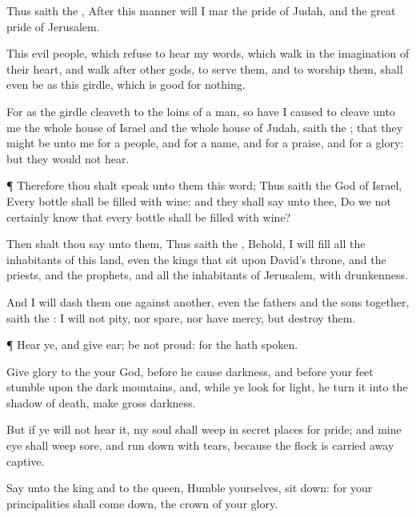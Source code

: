 {Thus
saith the
{}, After this manner will I
mar the
pride of
Judah, and the
great
pride of
Jerusalem.

This
evil
people, which
refuse to
hear my
words, which
walk in the
imagination of their
heart, and
walk
after
other
gods, to
serve them, and to
worship them, shall even be as this
girdle, which is
good for nothing.

For as the
girdle
cleaveth to the
loins of a
man, so have I caused to
cleave unto me the whole
house of
Israel and the whole
house of
Judah,
saith the
{}; that they might be unto me for a
people, and for a
name, and for a
praise, and for a
glory: but they would not
hear.


\par }{\PP {}¶ Therefore thou shalt
speak unto them this
word; Thus
saith the
{}
God of
Israel, Every
bottle shall be
filled with
wine: and they shall
say unto thee, Do we not
certainly
know that every
bottle shall be
filled with
wine?

Then shalt thou
say unto them, Thus
saith the
{}, Behold, I will
fill all the
inhabitants of this
land, even the
kings that
sit upon
David’s
throne, and the
priests, and the
prophets, and all the
inhabitants of
Jerusalem, with
drunkenness.

And I will
dash them
one against
another, even the
fathers and the
sons
together,
saith the
{}: I will not
pity, nor
spare, nor have
mercy, but
destroy them.


\par }{\PP {}¶
Hear ye, and give
ear; be not
proud: for the
{} hath
spoken.

Give
glory to the
{} your
God, before he cause
darkness, and before your
feet
stumble upon the
dark
mountains, and, while ye
look for
light, he
turn it into the shadow of
death,
{}
make
{} gross
darkness.

But if ye will not
hear it, my
soul shall
weep in secret
places
for
{}
pride; and mine
eye shall
weep
sore, and run
down with
tears, because the
{}
flock is carried away
captive.

Say unto the
king and to the
queen,
Humble yourselves, sit
down: for your
principalities shall come
down,
{} the
crown of your
glory.

}
